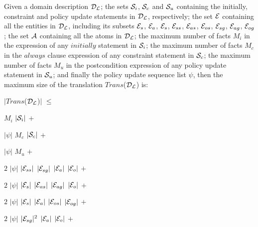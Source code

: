 \documentclass[global,twocolumn,final]{svjour}
\newenvironment{vtheorem}[1]
  {\begin{theorem}[#1]\hspace{0.25em}}
  {\end{theorem}}
\newenvironment{vquote}
  {\begin{list}{}{\leftmargin 1em}\item[]}
  {\end{list}}
\begin{document}
        \begin{vtheorem}{Translation Size}
          \label{the-size}
          Given a domain description ${\cal D_{L}}$; the sets ${\cal S}_{i}$,
          ${\cal S}_{c}$ and ${\cal S}_{u}$ containing the initially,
          constraint and policy update statements in ${\cal D_{L}}$,
          respectively; the set ${\cal E}$ containing all the entities in
          ${\cal D_{L}}$, including its subsets ${\cal E}_{s}$, ${\cal E}_{a}$,
          ${\cal E}_{s}$, ${\cal E}_{ss}$, ${\cal E}_{as}$, ${\cal E}_{os}$,
          ${\cal E}_{sg}$, ${\cal E}_{ag}$, ${\cal E}_{og}$; the set ${\cal A}$
          containing all the atoms in ${\cal D_{L}}$; the maximum number
          of facts $M_{i}$ in the expression of any $initially$ statement in
          ${\cal S}_{i}$; the maximum number of facts $M_{c}$ in the $always$
          clause expression of any constraint statement in ${\cal S}_{c}$;
          the maximum number of facts $M_{u}$ in the postcondition expression
          of any policy update statement in ${\cal S}_{u}$; and finally the
          policy update sequence list $\psi$, then the maximum size of the
          translation $Trans$(${\cal D_{L}}$) is:

         \begin{vquote}
            $|$$Trans$(${\cal D_{L}}$)$|$ $\leq$

            \hspace{1em}
            $M_{i}$ $|{\cal S}_{i}|$ $+$

            \hspace{1em}
            $|\psi|$ $M_{c}$ $|{\cal S}_{c}|$ $+$

            \hspace{1em}
            $|\psi|$ $M_{u}$ $+$

            \hspace{1em}
            $2$ $|\psi|$ $|{\cal E}_{ss}|$ $|{\cal E}_{sg}|$ $|{\cal E}_{a}|$ $|{\cal E}_{o}|$ $+$

            \hspace{1em}
            $2$ $|\psi|$ $|{\cal E}_{s}|$ $|{\cal E}_{as}|$ $|{\cal E}_{ag}|$ $|{\cal E}_{o}|$ $+$

            \hspace{1em}
            $2$ $|\psi|$ $|{\cal E}_{s}|$ $|{\cal E}_{a}|$ $|{\cal E}_{os}|$ $|{\cal E}_{og}|$ $+$

            \hspace{1em}
            $2$ $|\psi|$ $|{\cal E}_{sg}|^{2}$ $|{\cal E}_{a}|$ $|{\cal E}_{o}|$ $+$


\end{vquote}
\end{vtheorem}
\end{document}
